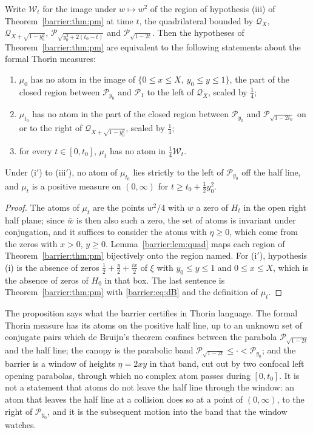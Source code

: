 \begin{proposition}\label{barrier:prop:window}
Write $\mathcal W_t$ for the image under $w\mapsto w^2$ of the region of hypothesis (iii) of Theorem~\ref{barrier:thm:pm} at time $t$, the quadrilateral bounded by $\mathcal Q_X$, $\mathcal Q_{X+\sqrt{1-y_0^2}}$, $\mathcal P_{\sqrt{y_0^2+2(t_0-t)}}$ and $\mathcal P_{\sqrt{1-2t}}$. Then the hypotheses of Theorem~\ref{barrier:thm:pm} are equivalent to the following statements about the formal Thorin measures:
\begin{enumerate}
\item[(i$'$)] $\mu_0$ has no atom in the image of $\{0\le x\le X,\ y_0\le y\le1\}$, the part of the closed region between $\mathcal P_{y_0}$ and $\mathcal P_1$ to the left of $\mathcal Q_X$, scaled by $\frac14$;
\item[(ii$'$)] $\mu_{t_0}$ has no atom in the part of the closed region between $\mathcal P_{y_0}$ and $\mathcal P_{\sqrt{1-2t_0}}$ on or to the right of $\mathcal Q_{X+\sqrt{1-y_0^2}}$, scaled by $\frac14$;
\item[(iii$'$)] for every $t\in[0,t_0]$, $\mu_t$ has no atom in $\frac14\mathcal W_t$.
\end{enumerate}
Under (i$'$) to (iii$'$), no atom of $\mu_{t_0}$ lies strictly to the left of $\mathcal P_{y_0}$ off the half line, and $\mu_t$ is a positive measure on $(0,\infty)$ for $t\ge t_0+\frac12y_0^2$.
\end{proposition}

\begin{proof}
The atoms of $\mu_t$ are the points $w^2/4$ with $w$ a zero of $H_t$ in the open right half plane; since $\bar w$ is then also such a zero, the set of atoms is invariant under conjugation, and it suffices to consider the atoms with $\eta\ge0$, which come from the zeros with $x>0$, $y\ge0$. Lemma~\ref{barrier:lem:quad} maps each region of Theorem~\ref{barrier:thm:pm} bijectively onto the region named. For (i$'$), hypothesis (i) is the absence of zeros $\frac12+\frac y2+\frac{ix}2$ of $\xi$ with $y_0\le y\le1$ and $0\le x\le X$, which is the absence of zeros of $H_0$ in that box. The last sentence is Theorem~\ref{barrier:thm:pm} with \eqref{barrier:eq:dB} and the definition of $\mu_t$.
\end{proof}

The proposition says what the barrier certifies in Thorin language. The formal Thorin measure has its atoms on the positive half line, up to an unknown set of conjugate pairs which de Bruijn's theorem confines between the parabola $\mathcal P_{\sqrt{1-2t}}$ and the half line; the canopy is the parabolic band $\mathcal P_{\sqrt{1-2t}}\le\cdot<\mathcal P_{y_0}$; and the barrier is a window of heights $\eta=2xy$ in that band, cut out by two confocal left opening parabolas, through which no complex atom passes during $[0,t_0]$. It is not a statement that atoms do not leave the half line through the window: an atom that leaves the half line at a collision does so at a point of $(0,\infty)$, to the right of $\mathcal P_{y_0}$, and it is the subsequent motion into the band that the window watches.

